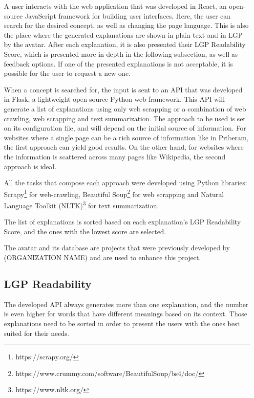 \documentclass[runningheads]{llncs}
\begin{document}
A user interacts with the web application that was developed in React\cite{react}, an open-source JavaScript framework for building user interfaces.
Here, the user can search for the desired concept, as well as changing the page language.
This is also the place where the generated explanations are shown in plain text and in LGP by the avatar.
After each explanation, it is also presented their LGP Readability Score, which is presented more in depth in the following subsection, as well as feedback options.
If one of the presented explanations is not acceptable, it is possible for the user to request a new one.

When a concept is searched for, the input is sent to an API that was developed in Flask\cite{flask}, a lightweight open-source Python web framework.
This API will generate a list of explanations using only web scrapping or a combination of web crawling, web scrapping and text summarization.
The approach to be used is set on its configuration file, and will depend on the initial source of information.
For websites where a single page can be a rich source of information like in Priberam\cite{priberam}, the first approach can yield good results.
On the other hand, for websites where the information is scattered across many pages like Wikipedia\cite{wikipedia}, the second approach is ideal.

All the tasks that compose each approach were developed using Python libraries: Scrapy\footnote{https://scrapy.org/} for web-crawling, Beautiful Soup\footnote{https://www.crummy.com/software/BeautifulSoup/bs4/doc/} for web scrapping and Natural Language Toolkit (NLTK)\footnote{https://www.nltk.org/} for text summarization.

The list of explanations is sorted based on each explanation's LGP Readability Score, and the ones with the lowest score are selected.

The avatar and its database are projects that were previously developed by (ORGANIZATION NAME) and are used to enhance this project.

\subsection{LGP Readability}

The developed API always generates more than one explanation, and the number is even higher for words that have different meanings based on its context.
Those explanations need to be sorted in order to present the users with the ones best suited for their needs.
\end{document}
